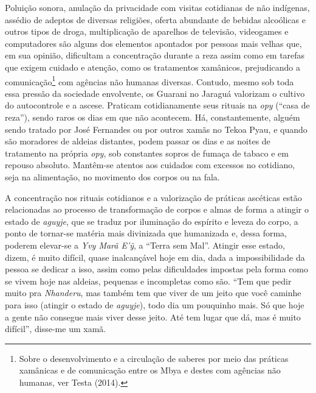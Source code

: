 Poluição sonora, anulação da privacidade com visitas cotidianas de não
indígenas, assédio de adeptos de diversas religiões, oferta abundante
de bebidas alcoólicas e outros tipos de droga, multiplicação de
aparelhos de televisão, videogames e computadores são alguns dos
elementos apontados por pessoas mais velhas que, em sua opinião,
dificultam a concentração durante a reza assim como em tarefas que
exigem cuidado e atenção, como os tratamentos xamânicos, prejudicando a
comunicação\footnote{Sobre o desenvolvimento e a circulação de saberes
por meio das práticas xamânicas e de comunicação entre os Mbya e destes
com agências não humanas, ver Testa (2014).} com agências não humanas
diversas. Contudo, mesmo sob toda essa pressão da sociedade envolvente,
os Guarani no Jaraguá valorizam o cultivo do autocontrole e a ascese.
Praticam cotidianamente seus rituais na \emph{opy} (``casa de reza''), sendo
raros os dias em que não acontecem. Há, constantemente, alguém sendo
tratado por José Fernandes ou por outros xamãs no Tekoa Pyau, e quando
são moradores de aldeias distantes, podem passar os dias e as noites de
tratamento na própria \emph{opy}, sob constantes sopros de fumaça de tabaco e
em repouso absoluto. Mantêm-se atentos aos cuidados com excessos no
cotidiano, seja na alimentação, no movimento dos corpos ou na fala.

A concentração nos rituais cotidianos e a valorização de práticas
ascéticas estão relacionadas ao processo de transformação de corpos e
almas de forma a atingir o estado de \emph{aguyje}, que se traduz por
iluminação do espírito e leveza do corpo, a ponto de tornar-se matéria
mais divinizada que humanizada e, dessa forma, poderem elevar-se a \emph{Yvy
Marã E’\~{y}}, a ``Terra sem Mal''. Atingir esse estado, dizem, é muito
difícil, quase inalcançável hoje em dia, dada a impossibilidade da
pessoa se dedicar a isso, assim como pelas dificuldades impostas pela
forma como se vivem hoje nas aldeias, pequenas e incompletas como são.
``Tem que pedir muito pra \emph{Nhanderu}, mas também tem que viver de um jeito
que você caminhe para isso (atingir o estado de \emph{aguyje}), todo dia um
pouquinho mais. Só que hoje a gente não consegue mais viver desse
jeito. Até tem lugar que dá, mas é muito difícil'', disse-me um xamã.

